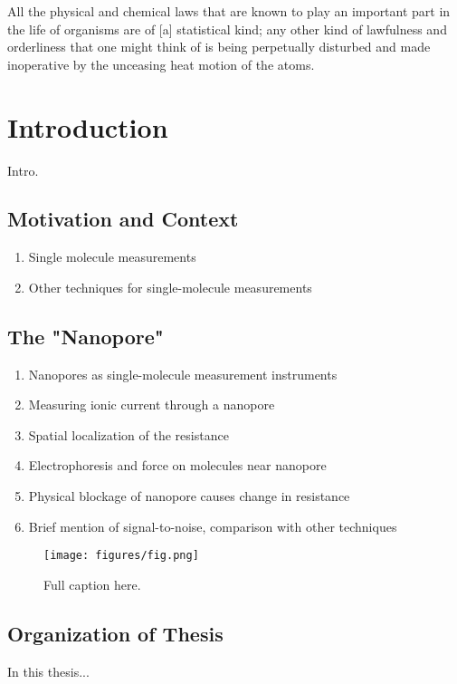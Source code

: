 \begin{savequote}[75mm]
All the physical and chemical laws that are known to play an important part in the life of organisms are of [a] statistical kind; any other kind of lawfulness and orderliness that one might think of is being perpetually disturbed and made inoperative by the unceasing heat motion of the atoms.
\end{savequote}

\chapter{Introduction}
\label{introduction}

Intro.

\section{Motivation and Context}

\begin{enumerate}
\item Single molecule measurements
\item Other techniques for single-molecule measurements
\end{enumerate}

\section{The "Nanopore"}

\begin{enumerate}
\item Nanopores as single-molecule measurement instruments
\item Measuring ionic current through a nanopore
\item Spatial localization of the resistance
\item Electrophoresis and force on molecules near nanopore
\item Physical blockage of nanopore causes change in resistance
\item Brief mention of signal-to-noise, comparison with other techniques
\end{enumerate}

\begin{figure}[h]
\begin{centering}
\texttt{[image: figures/fig.png]}
\caption[Brief caption]{Full caption here.}
\label{fig:Figlabel}
\end{centering}
\end{figure}

\section{Organization of Thesis}

In this thesis... \cite{Bryant1994} \cite{Vercoutere2001}